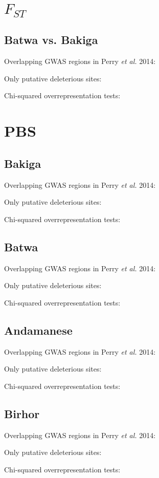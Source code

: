 \documentclass[12pt,landscape]{article}
\begin{document}
\section{$F_{ST}$}
\subsection{Batwa vs. Bakiga}

Overlapping GWAS regions in Perry \emph{et al.} 2014:

Only putative deleterious sites:

Chi-squared overrepresentation tests:


\section{PBS}
\subsection{Bakiga}

Overlapping GWAS regions in Perry \emph{et al.} 2014:

Only putative deleterious sites:

Chi-squared overrepresentation tests:


\subsection{Batwa}

Overlapping GWAS regions in Perry \emph{et al.} 2014:

Only putative deleterious sites:

Chi-squared overrepresentation tests:


\subsection{Andamanese}

Overlapping GWAS regions in Perry \emph{et al.} 2014:

Only putative deleterious sites:

Chi-squared overrepresentation tests:


\subsection{Birhor}

Overlapping GWAS regions in Perry \emph{et al.} 2014:

Only putative deleterious sites:

Chi-squared overrepresentation tests:

\end{document}
